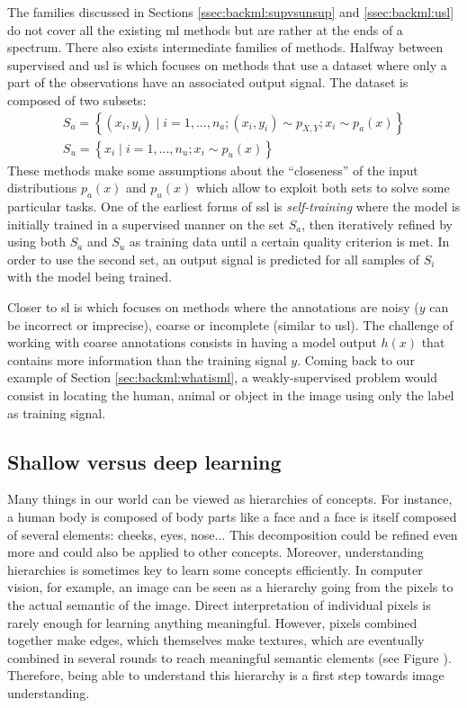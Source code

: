 The families discussed in Sections \ref{ssec:backml:supvsunsup} and \ref{ssec:backml:usl} do not cover all the existing \acrlong{ml} methods but are rather at the ends of a spectrum. There also exists intermediate families of methods. Halfway between supervised and \acrlong{usl} is  which focuses on methods that use a dataset where only a part of the observations have an associated output signal. The dataset is composed of two subsets:
\begin{eqnarray}
S_a = \left\{(x_i, y_i) \mid i = 1,...,n_a; (x_i, y_i) \sim p_{X,Y}; x_i \sim p_a(x)\right\} \\
S_u = \left\{x_i \mid i = 1,...,n_u; x_i \sim p_u(x)\right\}
\end{eqnarray}
These  methods make some assumptions about the ``closeness'' of the input distributions $p_a(x)$ and $p_u(x)$ \parencite{chapelle2006semi} which allow to exploit both sets to solve some particular tasks. One of the earliest forms of \acrlong{ssl} is \textit{self-training} where the model is initially trained in a supervised manner on the set $S_a$, then iteratively refined by using both $S_a$ and $S_u$ as training data until a certain quality criterion is met. In order to use the second set, an output signal is predicted for all samples of $S_i$ with the model being trained. 

Closer to \acrlong{sl} is  which focuses on methods where the annotations are noisy (\eg $y$ can be incorrect or imprecise), coarse or incomplete (similar to \acrlong{usl}). The challenge of working with coarse annotations consists in having a model output $h(x)$ that contains more information than the training signal $y$. Coming back to our example of Section \ref{sec:backml:whatisml}, a weakly-supervised problem would consist in locating the human, animal or object in the image using only the label as training signal.


\subsection{Shallow versus deep learning}

Many things in our world can be viewed as hierarchies of concepts. For instance, a human body is composed of body parts like a face and a face is itself composed of several elements: cheeks, eyes, nose... This decomposition could be refined even more and could also be applied to other concepts. Moreover, understanding hierarchies is sometimes key to learn some concepts efficiently. In computer vision, for example, an image can be seen as a hierarchy going from the pixels to the actual semantic of the image. Direct interpretation of individual pixels is rarely enough for learning anything meaningful. However, pixels combined together make edges, which themselves make textures, which are eventually combined in several rounds to reach meaningful semantic elements (see Figure ). Therefore, being able to understand this hierarchy is a first step towards image understanding.   

